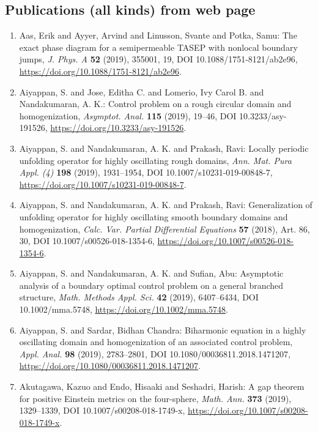 
\subsection{Publications (all kinds) from web page}

\begin{enumerate}
\item Aas, Erik and Ayyer, Arvind and Linusson, Svante and Potka,
Samu: The exact phase diagram for a semipermeable {TASEP} with
nonlocal boundary jumps, \emph{J. Phys. A} {\bf 52} (2019), 355001, 19, DOI 10.1088/1751-8121/ab2e96, \url{https://doi.org/10.1088/1751-8121/ab2e96}.
\item Aiyappan, S. and Jose, Editha C. and Lomerio, Ivy Carol B. and
Nandakumaran, A. K.: Control problem on a rough circular domain and homogenization, \emph{Asymptot. Anal.} {\bf 115} (2019), 19--46, DOI 10.3233/asy-191526, \url{https://doi.org/10.3233/asy-191526}.
\item Aiyappan, S. and Nandakumaran, A. K. and Prakash, Ravi: Locally periodic unfolding operator for highly oscillating
rough domains, \emph{Ann. Mat. Pura Appl. (4)} {\bf 198} (2019), 1931--1954, DOI 10.1007/s10231-019-00848-7, \url{https://doi.org/10.1007/s10231-019-00848-7}.
\item Aiyappan, S. and Nandakumaran, A. K. and Prakash, Ravi: Generalization of unfolding operator for highly oscillating
smooth boundary domains and homogenization, \emph{Calc. Var. Partial Differential Equations} {\bf 57} (2018), Art. 86, 30, DOI 10.1007/s00526-018-1354-6, \url{https://doi.org/10.1007/s00526-018-1354-6}.
\item Aiyappan, S. and Nandakumaran, A. K. and Sufian, Abu: Asymptotic analysis of a boundary optimal control problem on a
general branched structure, \emph{Math. Methods Appl. Sci.} {\bf 42} (2019), 6407--6434, DOI 10.1002/mma.5748, \url{https://doi.org/10.1002/mma.5748}.
\item Aiyappan, S. and Sardar, Bidhan Chandra: Biharmonic equation in a highly oscillating domain and
homogenization of an associated control problem, \emph{Appl. Anal.} {\bf 98} (2019), 2783--2801, DOI 10.1080/00036811.2018.1471207, \url{https://doi.org/10.1080/00036811.2018.1471207}.
\item Akutagawa, Kazuo and Endo, Hisaaki and Seshadri, Harish: A gap theorem for positive {E}instein metrics on the
four-sphere, \emph{Math. Ann.} {\bf 373} (2019), 1329--1339, DOI 10.1007/s00208-018-1749-x, \url{https://doi.org/10.1007/s00208-018-1749-x}.

\end{enumerate}
